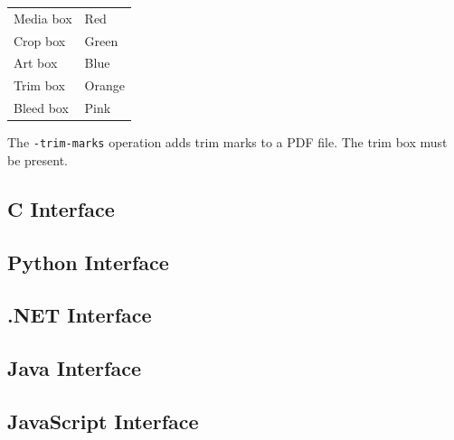 \documentclass{book}
\begin{document}
\medskip
\begin{tabular}{ll}
Media box & Red \\
Crop box & Green \\
Art box & Blue \\
Trim box & Orange \\
Bleed box & Pink 
\end{tabular}
\medskip

\noindent  The \texttt{-trim-marks} operation adds trim marks to a PDF file. The trim box must be present.

\begin{cpdflib}
\clearpage
\section*{C Interface}
\begin{small}\tt

\end{small}
\end{cpdflib}

\begin{pycpdflib}
\clearpage
\section*{Python Interface}
\begin{small}\tt

\end{small}
\end{pycpdflib}

\begin{dotnetcpdflib}
\clearpage
\section*{.NET Interface}
\begin{small}\tt

\end{small}
\end{dotnetcpdflib}

\begin{jcpdflib}
\clearpage
\section*{Java Interface}
\begin{small}\tt

\end{small}
\end{jcpdflib}

\begin{jscpdflib}
\clearpage
\section*{JavaScript Interface}
\begin{small}\tt

\end{small}
\end{jscpdflib}
\end{document}
